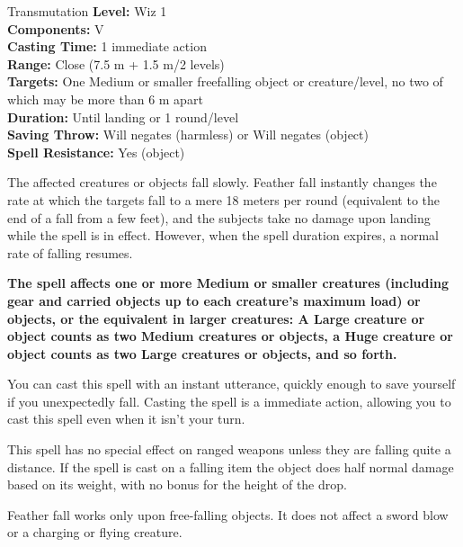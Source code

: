 {Transmutation}
{
	\textbf{Level:}
	Wiz 1\\
	\textbf{Components:}
	V\\
	\textbf{Casting Time:}
	1 immediate action\\
	\textbf{Range:}
	Close (7.5 m + 1.5 m/2 levels)\\
	\textbf{Targets:}
	One Medium or smaller freefalling object or creature/level, no two of which may be more than 6 m apart\\
	\textbf{Duration:}
	Until landing or 1 round/level\\
	\textbf{Saving Throw:}
	Will negates (harmless) or Will negates (object)\\
	\textbf{Spell Resistance:}
	Yes (object)\\
}
{
	The affected creatures or objects fall slowly. Feather fall instantly changes the rate at which the targets fall to a mere 18 meters per round (equivalent to the end of a fall from a few feet), and the subjects take no damage upon landing while the spell is in effect. However, when the spell duration expires, a normal rate of falling resumes.

	\textbf{	The spell affects one or more Medium or smaller creatures (including gear and carried objects up to each creature's maximum load) or objects, or the equivalent in larger creatures: A Large creature or object counts as two Medium creatures or objects, a Huge creature or object counts as two Large creatures or objects, and so forth.}

	You can cast this spell with an instant utterance, quickly enough to save yourself if you unexpectedly fall. Casting the spell is a immediate action, allowing you to cast this spell even when it isn't your turn.

	This spell has no special effect on ranged weapons unless they are falling quite a distance. If the spell is cast on a falling item the object does half normal damage based on its weight, with no bonus for the height of the drop.

	Feather fall works only upon free-falling objects. It does not affect a sword blow or a charging or flying creature.

}
